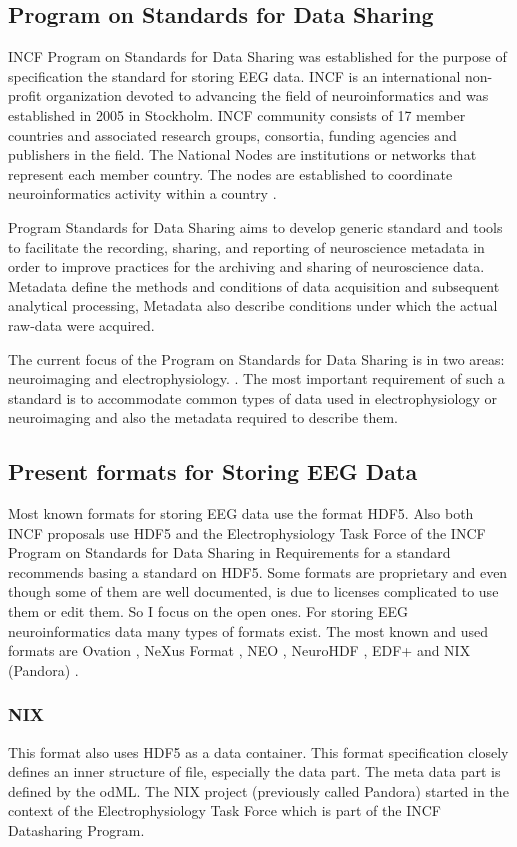 \documentclass[conference]{IEEEtran}
\begin{document}
\subsection{Program on Standards for Data Sharing}
\label{incf}
INCF Program on Standards for Data Sharing was established for the purpose of specification the standard for storing EEG data. INCF is an international non-profit organization devoted to advancing the field of neuroinformatics and was established in 2005 in Stockholm. INCF community consists of 17 member countries and associated research groups, consortia, funding agencies and publishers in the field. The National Nodes are institutions or networks that represent each member country. The nodes are established to coordinate neuroinformatics activity within a country \cite{incf_mission}.

Program Standards for Data Sharing aims to develop generic standard and tools to facilitate the recording, sharing, and reporting of neuroscience metadata in order to improve practices for the archiving and sharing of neuroscience data. Metadata define the methods and conditions of data acquisition and subsequent analytical processing, Metadata also describe conditions under which the actual raw-data were acquired.

The current focus of the Program on Standards for Data Sharing is in two areas: neuroimaging and electrophysiology. \cite{incf_mission}. The most important requirement of such a standard is to accommodate common types of data used in electrophysiology or neuroimaging and also the metadata required to describe them.

\subsection{Present formats for Storing EEG Data}
Most known formats for storing EEG data use the format HDF5. Also both INCF proposals use HDF5 and the Electrophysiology Task Force of the INCF Program on Standards for Data Sharing in Requirements for a standard recommends basing a standard on HDF5. \cite{requirements} Some formats are proprietary and even though some of them are well documented, is due to licenses complicated to use them or edit them. So I focus on the open ones. For storing EEG neuroinformatics data many types of formats exist. The most known and used formats are Ovation \cite{ovation}, NeXus Format \cite{nexus}, NEO \cite{neo}, NeuroHDF \cite{neurohdf}, EDF+ \cite{kemp2003} and NIX (Pandora) \cite{pandora}.
\subsubsection{NIX}
\label{nixsection}
This format also uses HDF5 as a data container. This format specification closely defines an inner structure of file, especially the data part. The meta data part is defined by the odML.
The NIX project (previously called Pandora) started in the context of the Electrophysiology Task Force which is part of the INCF Datasharing Program.
\end{document}
